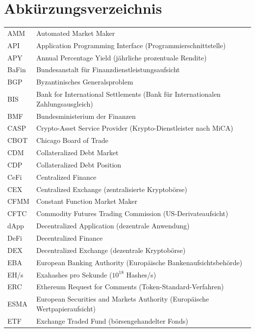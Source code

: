\documentclass[12pt,a4paper,oneside,BCOR=0mm]{scrreprt}
\begin{document}
\chapter*{Abkürzungsverzeichnis}
\begin{longtable}{@{}p{2.6cm}p{11.8cm}@{}}
AMM   & Automated Market Maker \\
API   & Application Programming Interface (Programmierschnittstelle) \\
APY   & Annual Percentage Yield (jährliche prozentuale Rendite) \\
BaFin & Bundesanstalt für Finanzdienstleistungsaufsicht \\
BGP   & Byzantinisches Generalsproblem \\
BIS   & Bank for International Settlements (Bank für Internationalen Zahlungsausgleich) \\
BMF   & Bundesministerium der Finanzen \\
CASP  & Crypto-Asset Service Provider (Krypto-Dienstleister nach MiCA) \\
CBOT  & Chicago Board of Trade \\
CDM   & Collateralized Debt Market \\
CDP   & Collateralized Debt Position \\
CeFi  & Centralized Finance \\
CEX   & Centralized Exchange (zentralisierte Kryptobörse) \\
CFMM  & Constant Function Market Maker \\
CFTC  & Commodity Futures Trading Commission (US-Derivateaufsicht) \\
dApp  & Decentralized Application (dezentrale Anwendung) \\
DeFi  & Decentralized Finance \\
DEX   & Decentralized Exchange (dezentrale Kryptobörse) \\
EBA   & European Banking Authority (Europäische Bankenaufsichtsbehörde) \\
EH/s  & Exahashes pro Sekunde ($10^{18}$ Hashes/s) \\
ERC   & Ethereum Request for Comments (Token-Standard-Verfahren) \\
ESMA  & European Securities and Markets Authority (Europäische Wertpapieraufsicht) \\
ETF   & Exchange Traded Fund (börsengehandelter Fonds) \\

\end{longtable}
\end{document}
